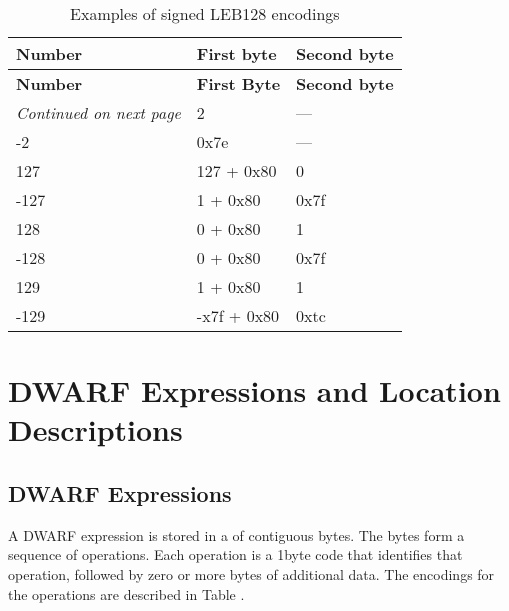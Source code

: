 \begin{centering}
\setlength{\extrarowheight}{0.1cm}
\begin{longtable}{l|l|l}
  \caption{Examples of signed LEB128 encodings} \label{tab:examplesofsignedleb128encodings} \\
  \hline \bfseries Number&\bfseries First byte &\bfseries Second byte \\ \hline
\endfirsthead
  \bfseries Number&\bfseries First Byte &\bfseries Second byte\\ \hline
\endhead
  \hline \emph{Continued on next page}
\endfoot
  \hline
\endlastfoot
2&2& --- \\
-2&0x7e& ---\\
127& 127 + 0x80 & 0 \\
-127& 1 + 0x80 & 0x7f \\
128& 0 + 0x80 & 1 \\
-128& 0 + 0x80 & 0x7f \\
129& 1 + 0x80 & 1 \\
-129& -x7f + 0x80 & 0xtc \\

\end{longtable}
\end{centering}



\section{DWARF Expressions and Location Descriptions}
\label{datarep:dwarfexpressionsandlocationdescriptions}
\subsection{DWARF Expressions}
\label{datarep:dwarfexpressions}

A 
DWARF expression is stored in a  of contiguous
bytes. The bytes form a sequence of operations. Each operation
is a 1\dash byte code that identifies that operation, followed by
zero or more bytes of additional data. The encodings for the
operations are described in 
Table . 

